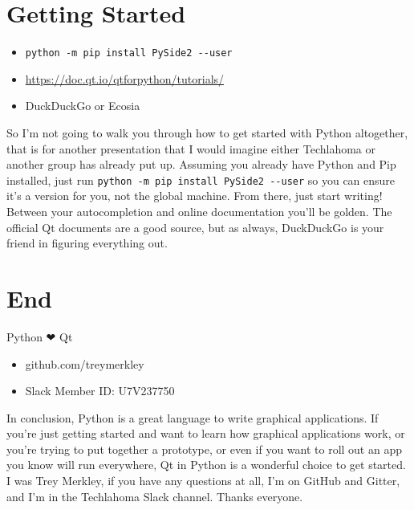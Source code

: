 \documentclass[11pt]{article}
\begin{document}
\section{Getting Started}
\label{sec:orgab52b5b}
\begin{itemize}
\item \texttt{python -m pip install PySide2 -{}-user}
\item \url{https://doc.qt.io/qtforpython/tutorials/}
\item DuckDuckGo or Ecosia
\end{itemize}

\begin{notes}
So I'm not going to walk you through how to get started with Python altogether, that is for another presentation that I would imagine either Techlahoma or another group has already put up. Assuming you already have Python and Pip installed, just run \texttt{python -m pip install PySide2 -{}-user} so you can ensure it's a version for you, not the global machine. From there, just start writing! Between your autocompletion and online documentation you'll be golden. The official Qt documents are a good source, but as always, DuckDuckGo is your friend in figuring everything out.
\end{notes}

\section{End}
\label{sec:orgeb4431a}
Python ❤ Qt
\begin{itemize}
\item github.com/treymerkley
\item Slack Member ID: U7V237750
\end{itemize}

\begin{notes}
In conclusion, Python is a great language to write graphical applications. If you're just getting started and want to learn how graphical applications work, or you're trying to put together a prototype, or even if you want to roll out an app you know will run everywhere, Qt in Python is a wonderful choice to get started. I was Trey Merkley, if you have any questions at all, I'm on GitHub and Gitter, and I'm in the Techlahoma Slack channel. Thanks everyone.
\end{notes}
\end{document}
